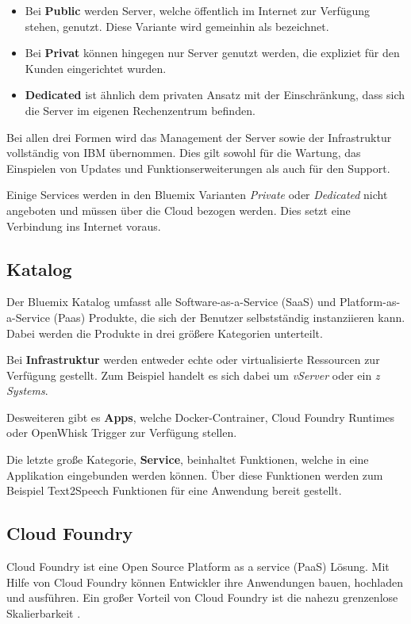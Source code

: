 \begin{itemize}
    \item Bei \textbf{Public} werden Server, welche öffentlich im Internet zur Verfügung stehen, genutzt. Diese Variante wird gemeinhin als  bezeichnet.
    \item Bei \textbf{Privat} können hingegen nur Server genutzt werden, die expliziet für den Kunden eingerichtet wurden.
    \item \textbf{Dedicated} ist ähnlich dem privaten Ansatz mit der Einschränkung, dass sich die Server im eigenen Rechenzentrum befinden.
\end{itemize}

Bei allen drei Formen wird das Management der Server sowie der Infrastruktur vollständig von IBM übernommen. Dies gilt
sowohl für die Wartung, das Einspielen von Updates und Funktionserweiterungen als auch für den Support.

Einige Services werden in den Bluemix Varianten \textit{Private} oder \textit{Dedicated} nicht angeboten und müssen über
die Cloud bezogen werden. Dies setzt eine Verbindung ins Internet voraus.

\subsection{Katalog}
Der Bluemix Katalog umfasst alle Software-as-a-Service (SaaS) und Platform-as-a-Service (Paas) Produkte, die sich der
Benutzer selbstständig instanziieren kann. Dabei werden die Produkte in drei größere Kategorien unterteilt.

Bei \textbf{Infrastruktur} werden entweder echte oder virtualisierte Ressourcen zur Verfügung gestellt. Zum Beispiel
handelt es sich dabei um \textit{vServer} oder ein \textit{z Systems}.

Desweiteren gibt es \textbf{Apps}, welche Docker-Contrainer, Cloud Foundry Runtimes oder OpenWhisk Trigger zur Verfügung
stellen.

Die letzte große Kategorie, \textbf{Service}, beinhaltet Funktionen, welche in eine Applikation eingebunden werden können.
Über diese Funktionen werden zum Beispiel Text2Speech Funktionen für eine Anwendung bereit gestellt.

\subsection{Cloud Foundry}
Cloud Foundry ist eine Open Source Platform as a service (PaaS) Lösung. Mit Hilfe von Cloud Foundry können Entwickler
ihre Anwendungen bauen, hochladen und ausführen. Ein großer Vorteil von Cloud Foundry ist die nahezu grenzenlose
Skalierbarkeit \cite{online_grundlagen_cloudfoundry}.

